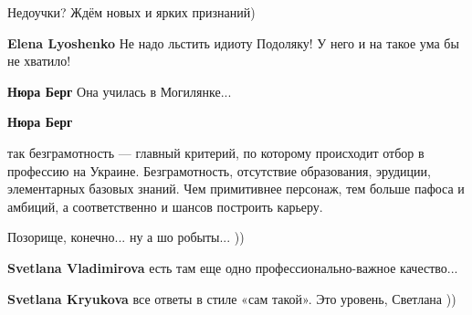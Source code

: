 \begin{itemize}
\begin{itemize}
Недоучки? Ждём новых и ярких признаний)

 
\textbf{Elena Lyoshenko} Не надо льстить идиоту Подоляку! У него и на такое ума бы не хватило!

 
\textbf{Нюра Берг} Она училась в Могилянке...

 
\textbf{Нюра Берг} 

так безграмотность — главный критерий, по которому происходит отбор в профессию
на Украине. Безграмотность, отсутствие образования, эрудиции, элементарных
базовых знаний. Чем примитивнее персонаж, тем больше пафоса и амбиций, а
соответственно и шансов построить карьеру.

Позорище, конечно... ну а шо робыты... ))

 

\textbf{Svetlana Vladimirova} есть там еще одно профессионально-важное качество...

 
\textbf{Svetlana Kryukova} все ответы в стиле «сам такой». Это уровень, Светлана ))

 

\end{itemize}
\end{itemize}
